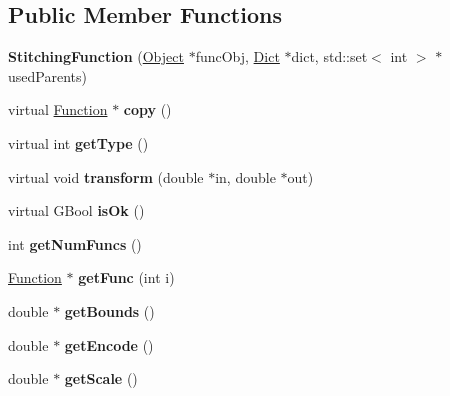 \subsection*{Public Member Functions}
\begin{DoxyCompactItemize}
\item 
\mbox{\label{class_stitching_function_a95b383440567da883fdc84e1d2eb9ea5}} 
{\bfseries Stitching\+Function} (\hyperlink{class_object}{Object} $\ast$func\+Obj, \hyperlink{class_dict}{Dict} $\ast$dict, std\+::set$<$ int $>$ $\ast$used\+Parents)
\item 
\mbox{\label{class_stitching_function_a29e1adb476ecb6cafa1ded449d99cf58}} 
virtual \hyperlink{class_function}{Function} $\ast$ {\bfseries copy} ()
\item 
\mbox{\label{class_stitching_function_ac35bc844915b2ae31f348121e3588532}} 
virtual int {\bfseries get\+Type} ()
\item 
\mbox{\label{class_stitching_function_aaa4fee6501c0914876f9a87baa30878e}} 
virtual void {\bfseries transform} (double $\ast$in, double $\ast$out)
\item 
\mbox{\label{class_stitching_function_af67e5419ac987917444cba09dbd715ae}} 
virtual G\+Bool {\bfseries is\+Ok} ()
\item 
\mbox{\label{class_stitching_function_a552465ff78be9bea029ee96e5044c459}} 
int {\bfseries get\+Num\+Funcs} ()
\item 
\mbox{\label{class_stitching_function_a65c9284b90e3c7893f5b2d9b26d68184}} 
\hyperlink{class_function}{Function} $\ast$ {\bfseries get\+Func} (int i)
\item 
\mbox{\label{class_stitching_function_a8293689bd9f38795c3a7dd2b7f4a665a}} 
double $\ast$ {\bfseries get\+Bounds} ()
\item 
\mbox{\label{class_stitching_function_afcc275f89ac79ba7c4fdd33a78ab79ff}} 
double $\ast$ {\bfseries get\+Encode} ()
\item 
\mbox{\label{class_stitching_function_a6d954176fe24ba6a7189a967ae91c35f}} 
double $\ast$ {\bfseries get\+Scale} ()
\end{DoxyCompactItemize}
